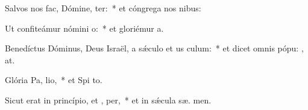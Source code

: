 \item Salvos nos fac, Dómine,  ter:~* et cóngrega nos  nibus:
\item Ut confiteámur nómini  o:~* et gloriémur   a.
\item Benedíctus Dóminus, Deus Israël, a sǽculo et us  culum:~* et dicet omnis pópu: , at.
\item Glória Pa,  lio,~* et Spi to.
\item Sicut erat in princípio, et ,  per,~* et in sǽcula sæ. men.
